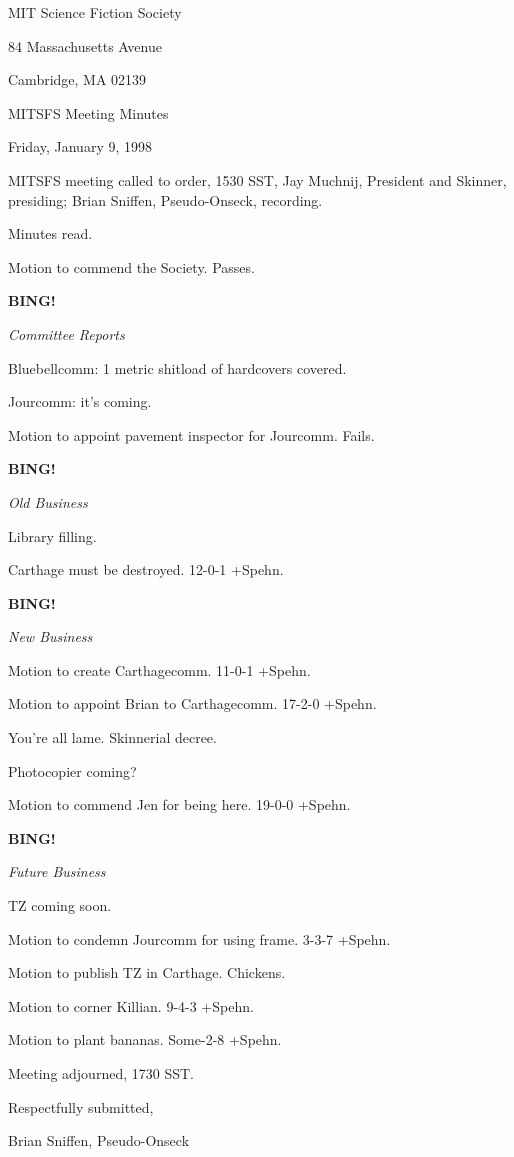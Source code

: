 \documentclass[12pt]{article}
\newcommand{\bing}{{\bf BING!} }
\newcommand{\goto}[1]{\bing \vskip 12pt \centerline{{\em{#1}}}}
\begin{document}
\begin{center}

MIT Science Fiction Society 

84 Massachusetts Avenue

Cambridge, MA 02139

\vspace{12pt}

MITSFS Meeting Minutes 

Friday, January 9, 1998

\end{center}
 
\vspace{18pt}

\setlength{\parskip}{6pt}

\noindent
MITSFS meeting called to order, 1530 SST,
Jay Muchnij, President and Skinner, presiding; Brian Sniffen, Pseudo-Onseck, recording.

Minutes read.

Motion to commend the Society. Passes.

\goto{Committee Reports}

Bluebellcomm: 1 metric shitload of hardcovers covered.

Jourcomm: it's coming.

Motion to appoint pavement inspector for Jourcomm. Fails.

\goto{Old Business}

Library filling.

Carthage must be destroyed. 12-0-1 +Spehn.

\goto{New Business}

Motion to create Carthagecomm. 11-0-1 +Spehn.

Motion to appoint Brian to Carthagecomm. 17-2-0 +Spehn.

You're all lame. Skinnerial decree.

Photocopier coming?

Motion to commend Jen for being here. 19-0-0 +Spehn.

\goto{Future Business}

TZ coming soon.

Motion to condemn Jourcomm for using frame. 3-3-7 +Spehn.

Motion to publish TZ in Carthage. Chickens.

Motion to corner Killian. 9-4-3 +Spehn.

Motion to plant bananas. Some-2-8 +Spehn.

\vspace{12pt}

\noindent
Meeting adjourned, 1730 SST.

\vspace{18pt}

\centerline{Respectfully submitted,}
\centerline{Brian Sniffen, Pseudo-Onseck}
\end{document}
